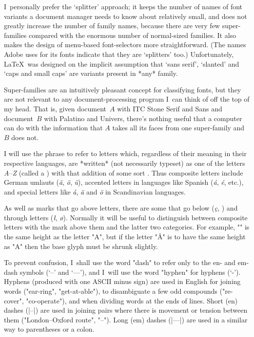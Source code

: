 	I~personally prefer the `splitter' approach; it keeps the number
	of names of font variants a document manager needs to know about
	relatively small, and does not greatly increase the number of
	family names, because there are very few super-families compared
	with the enormous number of normal-sized families.  It also
	makes the design of menu-based font-selectors more
	straightforward.  (The names Adobe uses for its fonts indicate
	that they are `splitters' too.)  Unfortunately, \LaTeX\ was
	designed on the implicit assumption that `sans serif', `slanted'
	and `caps and small caps' are variants present in *any* family.

	Super-families are an intuitively pleasant  concept for
	classifying fonts, but they are not relevant to any
	document-processing program I~can think of off the top of my
	head.  That is, given document~$A$ with ITC Stone Serif and Sans
	and document~$B$ with Palatino and Univers, there's nothing
	useful that a computer can do with the information that $A$
	takes all its faces from one super-family and $B$ does not.

\fi	%
\fi	%


	I will use the phrase  to refer to letters
	which, regardless of their meaning in their respective
	languages, are *written* (not necessarily typeset) as one of the
	letters {\it A}--{\it Z} (called a ) with that
	addition of some sort .  Thus composite letters
	include German umlauts ({\it\"a}, {\it\"o}, {\it\"u}), accented
	letters in languages like Spanish ({\it\'a}, {\it\'e}, etc.),
	and special letters like {\it\aa}, {\it\"a} and {\it\"o} in
	Scandinavian languages.

	As well as marks that go above letters, there are some that go
	below ({\it\c c}, {\it\a}) and through letters ({\it\l},
	{\it\o}).  Normally it will be useful to distinguish between
	composite letters with the mark above them and the latter two
	categories.  For example, "\A" is the same height as the letter
	"A", but if the letter "\AA" is to have the same height as "A"
	then the base glyph must be shrunk slightly.


	To prevent confusion, I~shall use the word "dash" to refer only
	to the en- and em-dash symbols (`--' and `---'), and I~will use
	the word "hyphen" for hyphens (`-').  	
\iflong
	Hyphens (produced with
	one ASCII minus sign) are used in English for joining words
	("ear-ring", "get-at-able"), to disambiguate a few odd compounds
	("re-cover", "co-operate"), and when dividing words at the ends
	of lines.  Short (en) dashes (|--|) are used in joining pairs
	where there is movement or tension between them ("London--Oxford
	route", "--").  Long (em) dashes (|---|) are used
	in a similar way to parentheses or a colon.
\fi

